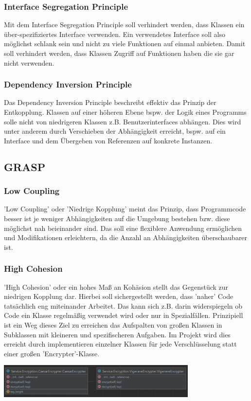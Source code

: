 \documentclass[12pt]{article}
\begin{document}
\subsubsection{Interface Segregation Principle}
Mit dem Interface Segregation Principle soll verhindert werden, dass Klassen ein über-spezifiziertes Interface verwenden. Ein verwendetes Interface soll also möglichst schlank sein und nicht zu viele Funktionen auf einmal anbieten. Damit soll verhindert werden, dass Klassen Zugriff auf Funktionen haben die sie gar nicht verwenden.

\subsubsection{Dependency Inversion Principle}
Das Dependency Inversion Principle beschreibt effektiv das Prinzip der Entkopplung. Klassen auf einer höheren Ebene bspw. der Logik eines Programms solle nicht von niedrigeren Klassen z.B. Benutzerinterfaces abhängen. Dies wird unter anderem durch Verschieben der Abhängigkeit erreicht, bspw. auf ein Interface und dem Übergeben von Referenzen auf konkrete Instanzen.

\subsection{GRASP}

\subsubsection{Low Coupling}
'Low Coupling' oder 'Niedrige Kopplung' meint das Prinzip, dass Programmcode besser ist je weniger Abhängigkeiten auf die Umgebung bestehen bzw. diese möglichst nah beieinander sind. Das soll eine flexiblere Anwendung ermöglichen und Modifikationen erleichtern, da die Anzahl an Abhängigkeiten überschaubarer ist.

\subsubsection{High Cohesion}
'High Cohesion' oder ein hohes Maß an Kohäsion stellt das Gegenstück zur niedrigen Kopplung dar. Hierbei soll sichergestellt werden, dass 'naher' Code tatsächlich eng miteinander Arbeitet. Das kann sich z.B. darin widerspiegeln ob Code ein Klasse regelmäßig verwendet wird oder nur in Spezialfällen. Prinzipiell ist ein Weg dieses Ziel zu erreichen das Aufspalten von großen Klassen in Subklassen mit kleineren und spezifischeren Aufgaben. Im Projekt wird dies erreicht durch implementieren einzelner Klassen für jede Verschlüsselung statt einer großen 'Encrypter'-Klasse.
\begin{center}
	\includegraphics[width=10cm]{bilder/High_Cohesion.png}
\end{center}
\end{document}
